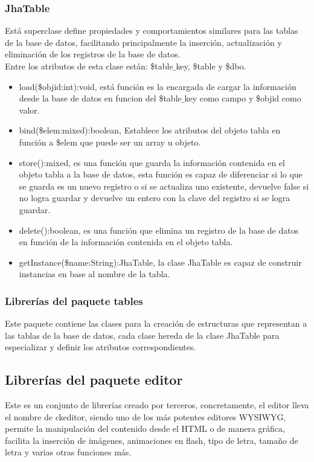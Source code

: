\subsubsection{JhaTable}
Est\'a superclase define propiedades y comportamientos similares para las tablas de la base de datos, facilitando principalmente la inserci\'on, actualizaci\'on y eliminaci\'on de los registros de la base de datos.\\
Entre los atributos de esta clase est\'an: \textsf{\$table$\_$key}, \textsf{\$table} y \textsf{\$dbo}.
\begin{itemize}
\item \textsf{load(\$objid:int):void}, est\'a funci\'on es la encargada de cargar la informaci\'on desde la base de datos en funcion del \textsf{\$table$\_$key} como campo y \textsf{\$objid} como valor.
\item \textsf{bind(\$elem:mixed):boolean}, Establece los atributos del objeto tabla en funci\'on a \textsf{\$elem} que puede ser un array u objeto.
\item \textsf{store():mixed}, es una funci\'on que guarda la informaci\'on contenida en el objeto tabla a la base de datos, esta funci\'on es capaz de diferenciar si lo que se guarda es un nuevo registro o si se actualiza uno existente, devuelve false si no logra guardar y devuelve un entero con la clave del registro si se logra guardar.
\item \textsf{delete():boolean}, es una funci\'on que elimina un registro de la base de datos en funci\'on de la informaci\'on contenida en el objeto tabla.
\item \textsf{getInstance(\$name:String):JhaTable}, la clase JhaTable es capaz de construir instancias en base al nombre de la tabla.
\end{itemize}

\subsubsection{Librer\'ias del paquete \textsf{tables}}
Este paquete contiene las clases para la creaci\'on de estructuras que representan a las tablas de la base de datos, cada clase hereda de la clase JhaTable para especializar y definir los atributos correspondientes.

\subsection{Librer\'ias del paquete \textsf{editor}}
Este es un conjunto de librer\'ias creado por terceros, concretamente, el editor lleva el nombre de ckeditor, siendo uno de los m\'as potentes editores WYSIWYG, permite la manipulaci\'on del contenido desde el HTML o de manera gr\'afica, facilita la inserci\'on de im\'agenes, animaciones en flash, tipo de letra, tama\~no de letra y varias otras funciones m\'as.

